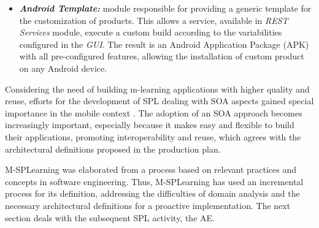 \begin{itemize}
	\item \textbf{\textit{Android Template:}} module responsible for providing a generic template for the customization of products. This allows a service, available in \textit{REST Services} module, execute a custom build according to the variabilities configured in the \textit{GUI}. The result is an Android Application Package (APK) with all pre-configured features, allowing the installation of custom product on any Android device.
\end{itemize}

Considering the need of building m-learning applications with higher quality and reuse, efforts for the development of SPL dealing with SOA aspects gained special importance in the mobile context \cite{marinho10, nascimento11}. The adoption of an SOA approach becomes increasingly important, especially because it makes easy and flexible to build their applications, promoting interoperability and reuse, which agrees with the architectural definitions proposed in the production plan.

M-SPLearning was elaborated from a process based on relevant practices and concepts in software engineering. Thus, M-SPLearning has used an incremental process for its definition, addressing the difficulties of domain analysis and the necessary architectural definitions for a proactive implementation. The next section deals with the subsequent SPL activity, the AE.

